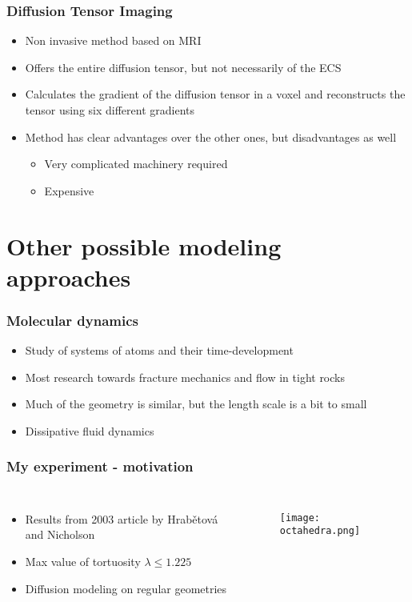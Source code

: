 \documentclass{beamer}
\begin{document}
 \begin{frame}
 \frametitle{Diffusion Tensor Imaging}
 \begin{itemize}
  \item Non invasive method based on MRI
  \item Offers the entire diffusion tensor, but not necessarily of the ECS
  \item Calculates the gradient of the diffusion tensor in a voxel and reconstructs the tensor using six different gradients
  \item Method has clear advantages over the other ones, but disadvantages as well
  \begin{itemize}
   \item Very complicated machinery required
   \item Expensive
  \end{itemize}

 \end{itemize}

\end{frame}

\section{Other possible modeling approaches}
\begin{frame}
 \frametitle{Molecular dynamics}
 \begin{itemize}
  \item Study of systems of atoms and their time-development
  \item Most research towards fracture mechanics and flow in tight rocks
  \item Much of the geometry is similar, but the length scale is a bit to small
  \item Dissipative fluid dynamics
 \end{itemize}
 
\end{frame}

\begin{frame}
 \frametitle{My experiment - motivation}
 \begin{columns}
  \column{2.0in}
  \begin{itemize}
   \item Results from 2003 article by Hrab\v{e}tov\'{a} and Nicholson
   \item Max value of tortuosity $\lambda \leq 1.225$
   \item Diffusion modeling on regular geometries
  \end{itemize}
\column{2.0in}
\begin{figure}[H]
\centering
\texttt{[image: octahedra.png]}
\end{figure}

 \end{columns}

\end{frame}
\end{document}
